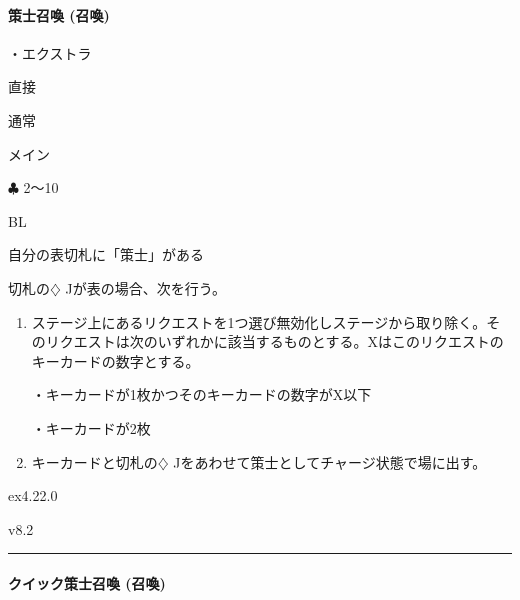 \documentclass[letterpaper,10pt,dvipdfmx]{sphinxmanual}
\begin{document}
\paragraph{策士召喚 (召喚)}
\label{\detokenize{auto/frameActionlist:act-summonstrategist}}\label{\detokenize{auto/frameActionlist:id68}}
\sphinxAtStartPar
{}

\sphinxAtStartPar
・エクストラ

\sphinxAtStartPar
{} 直接

\sphinxAtStartPar
{} 通常

\sphinxAtStartPar
{} メイン

\sphinxAtStartPar
{} {\normalsize $\clubsuit$} 2〜10

\sphinxAtStartPar
{} BL

\sphinxAtStartPar
{}

\sphinxAtStartPar
自分の表切札に「策士」がある

\sphinxAtStartPar
{}

\sphinxAtStartPar
切札の{\normalsize $\diamondsuit$} Jが表の場合、次を行う。
\begin{enumerate}
%
\item {} 
\sphinxAtStartPar
ステージ上にあるリクエストを1つ選び無効化しステージから取り除く。そのリクエストは次のいずれかに該当するものとする。Xはこのリクエストのキーカードの数字とする。

\sphinxAtStartPar
・キーカードが1枚かつそのキーカードの数字がX以下

\sphinxAtStartPar
・キーカードが2枚

\item {} 
\sphinxAtStartPar
キーカードと切札の{\normalsize $\diamondsuit$} Jをあわせて策士としてチャージ状態で場に出す。

\end{enumerate}

\sphinxAtStartPar
{}  ex4.22.0

\sphinxAtStartPar
{}  v8.2


\bigskip\hrule\bigskip



\paragraph{クイック策士召喚 (召喚)}
\label{\detokenize{auto/frameActionlist:act-quicksummonstrategist}}\label{\detokenize{auto/frameActionlist:id69}}
\sphinxAtStartPar
{}
\end{document}
